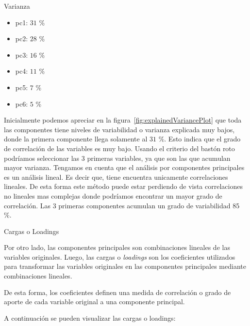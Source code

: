 \documentclass[11pt,a4paper,twoside]{thesis}
\begin{document}
\begin{description}
	\item[Varianza]
\end{description}
\begin{itemize}
	\item pc1: $31$ \%
	\item pc2: $28$ \%
	\item pc3: $16$ \%
	\item pc4: $11$ \%
	\item pc5: $7$ \%
	\item pc6: $5$ \%
\end{itemize}

Inicialmente podemos apreciar en la figura~\ref{fig:explainedVariancePlot} que
toda las componentes tiene niveles de variabilidad o varianza explicada muy
bajos, donde la primera componente llega solamente al $31$ \%. Esto indica que
el grado de correlación de las variables es muy bajo. Usando el criterio del
bastón roto podríamos seleccionar las 3 primeras variables, ya que son las que
acumulan mayor varianza. Tengamos en cuenta que el análisis por componentes
principales es un análisis lineal. Es decir que, tiene encuentra unicamente
correlaciones lineales. De esta forma este método puede estar perdiendo de
vista correlaciones no lineales mas complejas donde podríamos encontrar un
mayor grado de correlación. Las 3 primeras componentes acumulan un grado de
variabilidad 85 \%.

\begin{description}
	\item[Cargas o Loadings]
\end{description}

Por otro lado, las componentes principales son combinaciones lineales de las
variables originales. Luego, las cargas o \textit{loadings} son los
coeficientes utilizados para transformar las variables originales en las
componentes principales mediante combinaciones lineales.

De esta forma, los coeficientes definen una medida de correlación o grado de
aporte de cada variable original a una componente principal.

A continuación se pueden visualizar las cargas o loadings:
\end{document}
